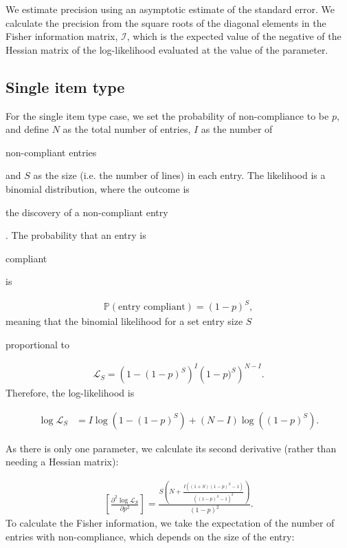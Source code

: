 \documentclass[useAMS,usenatbib,referee]{biom}
\newif\ifproofread
\newcommand{\rev}[1]{%
\ifproofread
\hl{#1}%
\else
#1%
\fi
}
\begin{document}
\rev{We estimate precision using an asymptotic estimate of the standard error. We calculate  the precision from the square roots of the diagonal elements in the Fisher information matrix, $\mathcal{I}$, which is the expected value of the negative of the Hessian matrix of the log-likelihood evaluated at the value of the parameter.}


\subsection{Single item type}
For the single item type case, we set the probability of non-compliance to be \(p\), and define \(N\) as the total number of entries, \(I\) as the number of \rev{non-compliant entries} and \(S\) as the size (i.e. the number of lines) in each entry. The likelihood is a binomial distribution, where the outcome is \rev{the discovery of a non-compliant entry}. The probability that an entry is \rev{compliant} is

\begin{align}
\mathbb{P}(\text{entry compliant}) = (1-p)^S,
\end{align}
meaning that the binomial likelihood for a set entry size $S$ \rev{proportional to}

\begin{align}
\mathcal{L}_S = \left(1-(1-p)^S\right)^I\left(1-p)^S\right)^{N-I}. \label{eq:entry_mode_like}
\end{align}
Therefore, the log-likelihood is

\begin{align}
  \log\mathcal{L}_S& = {I} \log\left(1-(1-p)^S\right)+(N-I)\log\left((1-p)^S\right).
  \label{eq:loglikelihood_arbitrary_entry_size}
\end{align}
\ifproofread
\textbf{\hl{Edited: omitted generalisation to varying entry sizes.}}
\fi
As there is only one parameter, we calculate its second derivative (rather than needing a Hessian matrix):

\begin{align}
\left[\frac{\partial^2 \log\mathcal{L}_S}{\partial p^2}\right]= 
\frac{S\left(N + \frac{I((1+S)(1-p)^S-1)}
{\left((1-p)^S-1 \right)^2} \right)}
{(1-p)^2}.\label{eq:loglike_2nd_deriv}
\end{align}
To calculate the Fisher information, we take the expectation of the number of entries with non-compliance, which depends on the size of the entry:
\end{document}
